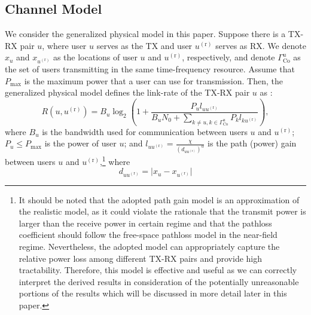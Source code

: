 \documentclass[journal,draftclsnofoot,onecolumn,12pt,twoside]{IEEEtran}
\begin{document}
\subsection{Channel Model}

We consider the generalized physical model in this paper. Suppose there is a TX-RX pair $u$, where user $u$ serves as the TX and user $u^{(\text{r})}$ serves as RX. We denote $x_u$ and $x_{u^{(\text{r})}}$ as the locations of user $u$ and $u^{(\text{r})}$, respectively, and denote $\Gamma_{\text{Co}}^u$ as the set of users transmitting in the same time-frequency resource. Assume that $P_{\text{max}}$ is the maximum power that a user can use for transmission. Then, the generalized physical model defines the link-rate of the TX-RX pair $u$ as \cite{agarwal2004capacity,xue2006scaling}:
\begin{equation}\label{eq:gen_model}
R(u,u^{(\text{r})})=B_u\log_2\left(1+\frac{P_ul_{uu^{(\text{r})}}}{B_uN_0+\sum_{k\neq u,k\in\Gamma^u_{\text{Co}}}P_kl_{ku^{(\text{r})}}}\right),
\end{equation}
where $B_{u}$ is the bandwidth used for communication between users $u$ and $u^{(\text{r})}$; $P_u\leq P_{\text{max}}$ is the power of user $u$; and $l_{uu^{(\text{r})}}=\frac{\chi}{\left(d_{uu^{(\text{r})}}\right)^{\alpha}}$ is the path (power) gain between users $u$ and $u^{(\text{r})}$,\footnote{It should be noted that the adopted path gain model is an approximation of the realistic model, as it could violate the rationale that the transmit power is larger than the receive power in certain regime and that the pathloss coefficient should follow the free-space pathloss model in the near-field regime. Nevertheless, the adopted model can appropriately capture the relative power loss among different TX-RX pairs and provide high tractability. Therefore, this model is effective and useful as we can correctly interpret the derived results in consideration of the potentially unreasonable portions of the results which will be discussed in more detail later in this paper.} where
\begin{equation}
d_{uu^{(\text{r})}}=\vert x_u-x_{u^{(\text{r})}}\vert
\end{equation}
\end{document}
